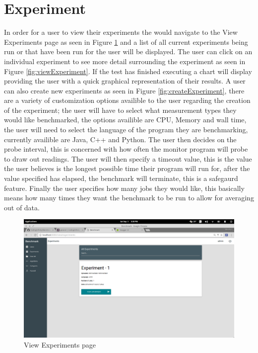 \documentclass[11pt,a4paper]{article}
\begin{document}
\section{Experiment}
In order for a user to view their experiments the would navigate to the View Experiments
page as seen in Figure \ref{fig:viewExperiments} and a list of all current experiments 
being run or that have been run for the user will be displayed. The user can click on
an individual experiment to see more detail surrounding the experiment as seen in 
Figure \ref{fig:viewExperiment}. If the test has finished executing a chart will display
providing the user with a quick graphical representation of their results. A user can also
create new experiments as seen in Figure \ref{fig:createExperiment}, there are a variety
of customization options availible to the user regarding the creation of the experiment;
the user will have to select what measurement types they would like benchmarked, the options
availible are CPU, Memory and wall time, the user will need to select the language of the 
program they are benchmarking, currently availible are Java, C++ and Python. The user then
decides on the probe interval, this is concerned with how often the monitor program will
probe to draw out readings. The user will then specify a timeout value, this is the value
the user believes is the longest possible time their program will run for, after the value
specified has elapsed, the benchmark will terminate, this is a safegaurd feature. Finally 
the user specifies how many jobs they would like, this basically means how many times they
want the benchmark to be run to allow for averaging out of data.
\begin{figure}[H]
	\begin{center}
		\includegraphics[scale=0.3]{../Images/User Manual/View Experiments.png}
		\caption{View Experiments page}
		\label{fig:viewExperiments}
	\end{center}  
\end{figure}
\end{document}

